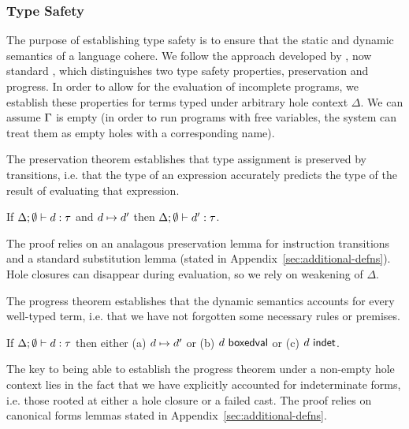 \subsubsection{Type Safety} 
The purpose of establishing type safety is to ensure that the static and dynamic semantics of a language cohere. 
We follow the approach developed by \citet{wright94:_type_soundness}, now standard \cite{pfpl}, which distinguishes two type safety properties, preservation and progress. 
In order to allow for the evaluation of incomplete programs, we establish these properties for terms typed under arbitrary hole context $\Delta$. 
We can assume $\Gamma$ is empty (in order to run programs with free variables, the system can treat them as empty holes with a corresponding name).

The preservation theorem establishes that type assignment is preserved by transitions, i.e. that the type of an expression accurately predicts the type of the result of evaluating that expression.

\begin{thm}[Preservation]
  If $\Delta; \emptyset \vdash d : \tau$ and
  $d \mapsto d'$ then
  $\Delta; \emptyset \vdash d' : \tau$.
\end{thm}
\noindent
The proof relies on an analagous preservation lemma for instruction transitions and a standard substitution lemma (stated in Appendix~\ref{sec:additional-defns}). 
Hole closures can disappear during evaluation, so we rely on weakening of $\Delta$.

The progress theorem establishes that the dynamic semantics accounts for every well-typed term, i.e. that we have not forgotten some necessary rules or premises.
\begin{thm}[Progress]
  If $\Delta; \emptyset \vdash d : \tau$ then either
  (a) $d \mapsto d'$ or
  (b) $d~\mathsf{boxedval}$ or 
  (c) $d~\mathsf{indet}$.
\end{thm}
\noindent
The key to being able to establish the progress theorem under a non-empty hole context lies in the fact that we have explicitly accounted for indeterminate forms, i.e. those rooted at either a hole closure or a failed cast. 
The proof relies on canonical forms lemmas stated in Appendix~\ref{sec:additional-defns}.

